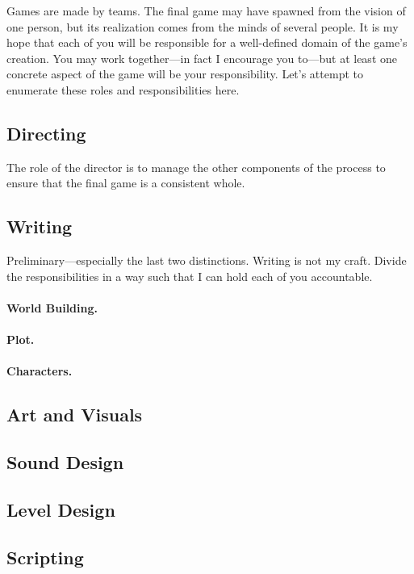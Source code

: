 \documentclass{article}
\begin{document}
Games are made by teams. The final game may have spawned from the vision of one person, but its realization comes from the minds of several people. It is my hope that each of you will be responsible for a well-defined domain of the game's creation. You may work together---in fact I encourage you to---but at least one concrete aspect of the game will be your responsibility. Let's attempt to enumerate these roles and responsibilities here.

\subsection*{Directing}
The role of the director is to manage the other components of the process to ensure that the final game is a consistent whole.

\subsection*{Writing}
Preliminary---especially the last two distinctions. Writing is not my craft. Divide the responsibilities in a way such that I can hold each of you accountable.

\paragraph{World Building.}

\paragraph{Plot.}

\paragraph{Characters.}

\subsection*{Art and Visuals}

\subsection*{Sound Design}

\subsection*{Level Design}

\subsection*{Scripting}
\end{document}
